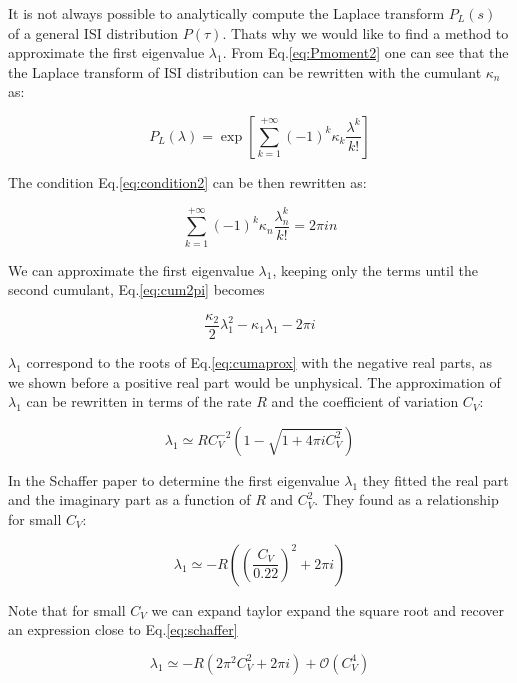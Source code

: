 \documentclass[a4paper,11pt,twoside]{article}
\numberwithin{equation}{section}
\begin{document}
It is not always possible to analytically compute the Laplace transform $P_L(s)$ of a general ISI distribution $P(\tau)$. Thats why we would like to find a method to approximate the first eigenvalue $\lambda_1$. From Eq.\eqref{eq:Pmoment2} one can see that the the Laplace transform of ISI distribution can be rewritten with the cumulant $\kappa_n$ as:

\begin{equation}
\label{eq:PLcum}
P_L(\lambda)=\exp\left[ \sum_{k=1}^{+\infty}(-1)^k\kappa_k \frac{\lambda^k}{k!}\right]
\end{equation}

The condition Eq.\eqref{eq:condition2} can be then rewritten as:

\begin{equation}
\label{eq:cum2pi}
 \sum_{k=1}^{+\infty}(-1)^k\kappa_n \frac{\lambda_n^k}{k!}=2 \pi i n
\end{equation}

We can approximate the first eigenvalue $\lambda_1$, keeping only the terms until the second cumulant, Eq.\eqref{eq:cum2pi} becomes

\begin{equation}
\label{eq:cumaprox}
\frac{\kappa_2}{2}\lambda_1^2-\kappa_1\lambda_1 -2\pi i
\end{equation}

$\lambda_1$ correspond to the roots of Eq.\eqref{eq:cumaprox} with the negative real parts, as we shown before a positive real part would be unphysical. The approximation of $\lambda_1$ can be rewritten in terms of the rate $R$ and the coefficient of variation $C_V$: 

\begin{equation}
\label{eq:l1aprox}
\lambda_1\simeq RC_V^{-2}\left( 1-\sqrt{1+4\pi i C_V^2}\right)
\end{equation}

In the Schaffer paper to determine the first eigenvalue $\lambda_1$ they fitted the real part and the imaginary part as a function of $R$ and $C_V^2$. They found as a relationship for small $C_V$:

\begin{equation}
\label{eq:schaffer}
\lambda_1 \simeq -R\left( (\frac{C_V}{0.22})^2+2\pi i\right) 
\end{equation}

Note that for small $C_V$ we can expand taylor expand the square root and recover an expression close to Eq.\eqref{eq:schaffer}

\begin{equation}
\label{eq:l1aprox2}
\lambda_1\simeq -R\left(2\pi^2 C_V^2+2\pi i\right) + \mathcal{O}(C_V^4)
\end{equation}
\end{document}
